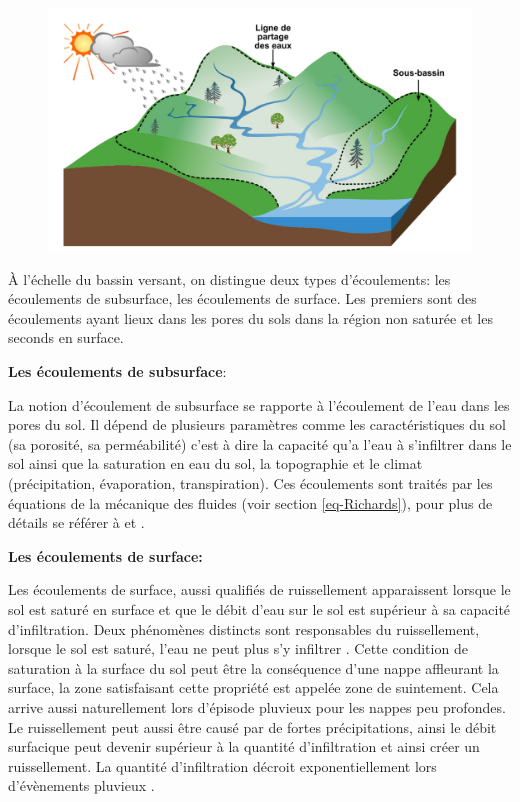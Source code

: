 \documentclass[a4paper,11pt]{article}
\numberwithin{equation}{section}
\begin{document}
\begin{figure}
	\begin{center}
		\includegraphics[scale=0.15]{bassin_versant.png}
	\end{center}
	\label{fig:Bassin versant}
\end{figure}

À l’échelle du bassin versant, on distingue deux types d’écoulements: les écoulements de subsurface, les écoulements de surface. Les premiers sont des écoulements ayant lieux dans les pores du sols dans la région non saturée et les seconds en surface.


\vspace{0.7cm}

\noindent\textbf{Les écoulements de subsurface}:

La notion d'écoulement de subsurface se rapporte à l'écoulement de l'eau dans les pores du sol. Il dépend de plusieurs paramètres comme les caractéristiques du sol (sa porosité, sa perméabilité) c'est à dire la capacité qu'a l'eau à s'infiltrer dans le sol ainsi que la saturation en eau du sol, la topographie et le climat (précipitation, évaporation, transpiration). Ces écoulements sont traités par les équations de la mécanique des fluides (voir section  \ref{eq-Richards}), pour plus de détails se référer à \cite{maquin2016developpement} et \cite{marsily_de1986quantitative}. 

\vspace{0.7cm}

\noindent\textbf{Les écoulements de surface:}

Les écoulements de surface, aussi qualifiés de ruissellement apparaissent lorsque le sol est saturé en surface et que le débit d'eau sur le sol est supérieur à sa capacité d'infiltration. Deux phénomènes distincts sont responsables du ruissellement, lorsque le sol est saturé, l’eau ne peut plus s’y infiltrer \cite{cappus1960etude}. Cette condition de saturation à la surface du sol peut être la conséquence d'une nappe affleurant la surface, la zone satisfaisant cette propriété est appelée zone de suintement. Cela arrive aussi naturellement lors d'épisode pluvieux pour les nappes peu profondes. Le ruissellement peut aussi être causé par de fortes précipitations, ainsi le débit surfacique peut devenir supérieur à la quantité d'infiltration et ainsi créer un ruissellement. La quantité d'infiltration décroit exponentiellement lors d'évènements pluvieux \cite{horton1933role}.  
\end{document}
